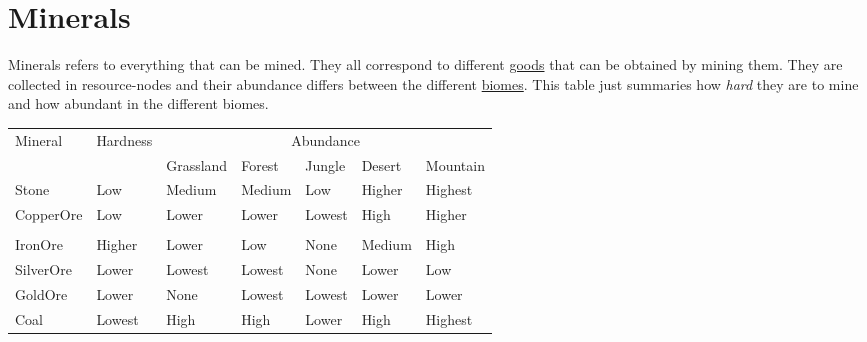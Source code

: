 \section{Minerals}\label{ch:World:Minerals}

Minerals refers to everything that can be mined. They all correspond to
different \hyperref[ch:Goods:Nature:Minerals]{goods} that can be obtained by
mining them. They are collected in resource-nodes and their abundance differs
between the different \hyperref[ch:ch:World:Biomes]{biomes}. This table just
summaries how \emph{hard} they are to mine and how abundant in the different
biomes.

\begin{longtable}{lllllll}
	\toprule
	Mineral         & Hardness & \multicolumn{5}{c}{Abundance}                                                               \\
	                &          & \Gls{Grassland}               & \Gls{Forest} & \Gls{Jungle} & \Gls{Desert} & \Gls{Mountain} \\
	\midrule
	\Gls{Stone}     & Low      & Medium                        & Medium       & Low          & Higher       & Highest        \\
	\Gls{CopperOre} & Low      & Lower                         & Lower        & Lowest       & High         & Higher         \\                                                                                         \\
	\Gls{IronOre}   & Higher   & Lower                         & Low          & None         & Medium       & High           \\
	\Gls{SilverOre} & Lower    & Lowest                        & Lowest       & None         & Lower        & Low            \\
	\Gls{GoldOre}   & Lower    & None                          & Lowest       & Lowest       & Lower        & Lower          \\
	\Gls{Coal}      & Lowest   & High                          & High         & Lower        & High         & Highest        \\
	\bottomrule
\end{longtable}

